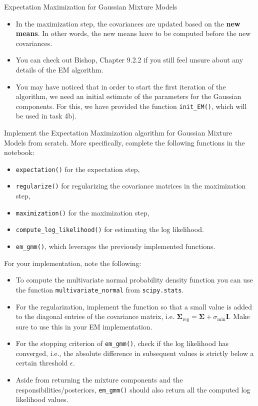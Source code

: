 \documentclass[
	english,
        solution=true
	]{tudaexercise}
\begin{document}
\begin{task}[points=6 + 4]{Expectation Maximization for Gaussian Mixture Models}
\begin{itemize}
    \item In the maximization step, the covariances are updated based on the \textbf{new means}. In other words, the new means have to be computed before the new covariances.
    \item You can check out Bishop, Chapter 9.2.2 if you still feel unsure about any details of the EM algorithm.
    \item You may have noticed that in order to start the first iteration of the algorithm, we need an initial estimate of the parameters for the Gaussian components. For this, we have provided the function \texttt{init\_EM()}, which will be used in task 4b).
\end{itemize}


\begin{subtask}[points=6,title=EM Implementation]

Implement the Expectation Maximization algorithm for Gaussian Mixture Models from scratch. More specifically, complete the following functions in the notebook:
    \begin{itemize}
        \item \texttt{expectation()} for the expectation step,
        \item \texttt{regularize()} for regularizing the covariance matrices in the maximization step,
        \item \texttt{maximization()} for the maximization step,
        \item \texttt{compute\_log\_likelihood()} for estimating the log likelihood.
        \item \texttt{em\_gmm()}, which leverages the previously implemented functions. 
    \end{itemize}
For your implementation, note the following:
\begin{itemize}
    \item To compute the multivariate normal probability density function you can use the function \texttt{multivariate\_normal} from \texttt{scipy.stats}. 
    \item {For the regularization, implement the function so that a small value is added to the diagonal entries of the covariance matrix, i.e. $\boldsymbol{\Sigma}_{\text{reg}}=\boldsymbol{\Sigma}+\sigma_{\text{min}}\boldsymbol{I}$. Make sure to use this in your EM implementation.}
    \item For the stopping criterion of \texttt{em\_gmm()}, check if the log likelihood has converged, i.e., the absolute difference in subsequent values is strictly below a certain threshold $\epsilon$.
    \item Aside from returning the mixture components and the responsibilities/posteriors, \texttt{em\_gmm()} should also return all the computed log likelihood values.
\end{itemize}


\end{subtask}
\end{task}
\end{document}
